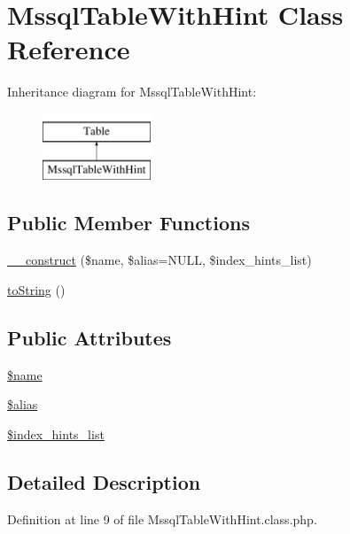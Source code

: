 \hypertarget{classMssqlTableWithHint}{\section{Mssql\-Table\-With\-Hint Class Reference}
\label{classMssqlTableWithHint}
}
Inheritance diagram for Mssql\-Table\-With\-Hint\-:\begin{figure}[H]
\begin{center}
\leavevmode
\includegraphics[height=2.000000cm]{classMssqlTableWithHint}
\end{center}
\end{figure}
\subsection*{Public Member Functions}
\begin{DoxyCompactItemize}
\item 
\hyperlink{classMssqlTableWithHint_ab478fe053492be637981f452c8aa2924}{\-\_\-\-\_\-construct} (\$name, \$alias=N\-U\-L\-L, \$index\-\_\-hints\-\_\-list)
\item 
\hyperlink{classMssqlTableWithHint_ac73aaae941e5dd3f4c22d7c718a317f8}{to\-String} ()
\end{DoxyCompactItemize}
\subsection*{Public Attributes}
\begin{DoxyCompactItemize}
\item 
\hyperlink{classMssqlTableWithHint_a277ff00978ac421ee07783d796318bf5}{\$name}
\item 
\hyperlink{classMssqlTableWithHint_abe5643a9f48a397be1d66f7aba2fd7d9}{\$alias}
\item 
\hyperlink{classMssqlTableWithHint_af748588ba4420eb31c412a83b1623a60}{\$index\-\_\-hints\-\_\-list}
\end{DoxyCompactItemize}


\subsection{Detailed Description}


Definition at line 9 of file Mssql\-Table\-With\-Hint.\-class.\-php.



